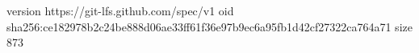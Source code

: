version https://git-lfs.github.com/spec/v1
oid sha256:ce182978b2c24be888d06ae33ff61f36e97b9ec6a95fb1d42cf27322ca764a71
size 873
